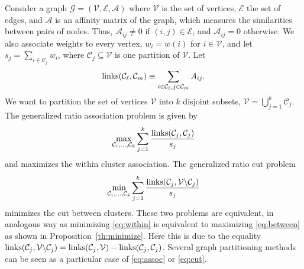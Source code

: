 \documentclass[aps,preprint,nofootinbib,floatfix]{revtex4-1}
\newcommand\C{{\mathcal{C}}}
\begin{document}
Consider a graph $\mathcal{G} = (\mathcal{V}, \mathcal{E}, \mathcal{A})$
where $\mathcal{V}$ is the set of vertices, $\mathcal{E}$ the set of edges,
and $\mathcal{A}$ is an affinity matrix of the graph, 
which measures the 
similarities between pairs of nodes. Thus, $\mathcal{A}_{ij} \ne 0$
if $(i,j) \in \mathcal{E}$, and $\mathcal{A}_{ij} = 0$ otherwise.
We also associate weights to every vertex, 
$w_i = w(i)$ for $i \in \mathcal{V}$, and let $s_j = \sum_{ i \in \C_j} w_i$,
where $\C_j \subseteq \mathcal{V}$ is one partition of $\mathcal{V}$.
Let
\begin{equation}
\textnormal{links}(\C_\ell, \C_m) \equiv 
\sum_{i\in \C_\ell, j\in \C_m } A_{ij} .
\end{equation}
We want to partition the set of vertices $\mathcal{V}$ into $k$ disjoint
subsets, $\mathcal{V} = \bigcup_{j=1}^k \C_j $. 
The generalized ratio association problem is given by
\begin{equation}
\label{eq:assoc}
\max_{\C_i,\dots,\C_k} \sum_{j=1}^k \dfrac{\textnormal{links}(\C_j,\C_j)}{s_j}
\end{equation}
and maximizes the within cluster association.
The generalized ratio cut problem
\begin{equation}
\label{eq:cut}
\min_{\C_i,\dots,\C_k} \sum_{j=1}^k
\dfrac{\textnormal{links}(\C_j,\mathcal{V} \backslash \C_j)}{s_j}
\end{equation}
minimizes the cut between clusters. These two problems are equivalent,
in analogous way as minimizing \eqref{eq:within} is equivalent to
maximizing \eqref{eq:between} as shown in Proposition~\ref{th:minimize}.
Here this is due to the equality
$\textnormal{links}(\C_j,\mathcal{V} \backslash \C_j)=
\textnormal{links}(\C_j,\mathcal{V}) - \textnormal{links}(\C_j,\C_j)$.
Several graph partitioning methods 
\cite{Kernighan,Malik,Chan,Yu}
can be seen as a particular case of \eqref{eq:assoc} or \eqref{eq:cut}.
\end{document}
